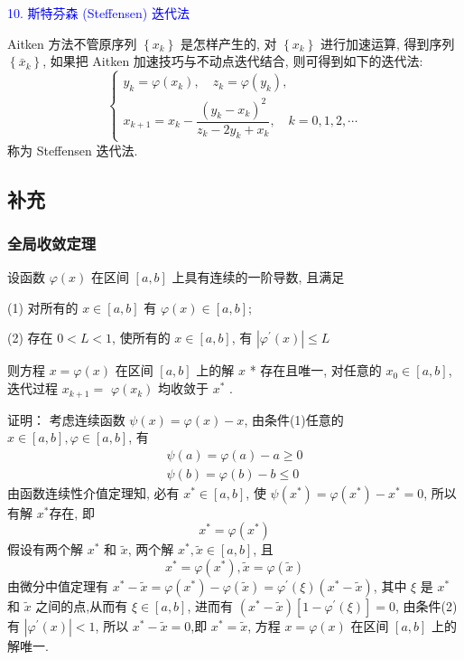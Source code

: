 \textcolor{blue}{10. 斯特芬森 (Steffensen) 迭代法}

Aitken 方法不管原序列 $ \left\{x_{k}\right\} $ 是怎样产生的, 对 $ \left\{x_{k}\right\} $ 进行加速运算, 得到序列 $ \left\{\bar{x}_{k}\right\} $, 如果把 Aitken 加速技巧与不动点迭代结合, 则可得到如下的迭代法:
$$
\left\{\begin{array}{l}
y_{k}=\varphi\left(x_{k}\right), \quad z_{k}=\varphi\left(y_{k}\right), \\
x_{k+1}=x_{k}-\dfrac{\left(y_{k}-x_{k}\right)^{2}}{z_{k}-2 y_{k}+x_{k}}, \quad k=0,1,2, \cdots
\end{array}\right.
$$
称为 Steffensen 迭代法.

\subsection{补充}
\subsubsection{全局收敛定理}
\begin{tcolorbox}[enhanced,colback=2,colframe=1,breakable,coltitle=black,title=全局收敛定理]

设函数 $ \varphi(x) $ 在区间 $ [a, b] $ 上具有连续的一阶导数, 且满足

(1) 对所有的 $ x \in[a, b] $ 有 $ \varphi(x) \in[a, b] $;

(2) 存在 $ 0<L<1 $, 使所有的 $ x \in[a, b] $, 有
$
\left|\varphi^{\prime}(x)\right| \leqslant L
$

则方程 $ x=\varphi(x) $ 在区间 $ [a, b] $ 上的解 $ x $ * 存在且唯一, 对任意的 $ x_{0} \in[a, b] $, 迭代过程 $ x_{k+1}= $ $ \varphi\left(x_{k}\right) $ 均收敛于 $ x^{*} $ .
\end{tcolorbox}

证明： 考虑连续函数 $ \psi(x)=\varphi(x)-x $, 由条件(1)任意的 $ x \in[a, b], \varphi \in[a, b] $, 有
$$
\begin{array}{l}
\psi(a)=\varphi(a)-a \geqslant 0 \\
\psi(b)=\varphi(b)-b \leqslant 0
\end{array}
$$
由函数连续性介值定理知, 必有 $ x^{*} \in[a, b] $, 使 $ \psi\left(x^{*}\right)=\varphi\left(x^{*}\right)-x^{*}=0 $, 所以有解 $ x^{*} $存在, 即
$$
x^{*}=\varphi\left(x^{*}\right)
$$
假设有两个解 $ x^{*} $ 和 $ \tilde{x} $, 两个解 $ x^{*}, \tilde{x} \in[a, b] $, 且
$$
x^{*}=\varphi\left(x^{*}\right), \tilde{x}=\varphi(\tilde{x})
$$
由微分中值定理有 $ x^{*}-\tilde{x}=\varphi\left(x^{*}\right)-\varphi(\tilde{x})=\varphi^{\prime}(\xi)\left(x^{*}-\tilde{x}\right) $, 其中 $ \xi $ 是 $ x^{*} $ 和 $ \tilde{x} $ 之间的点,从而有 $ \xi \in[a, b] $, 进而有 $ \left(x^{*}-\tilde{x}\right)\left[1-\varphi^{\prime}(\xi)\right]=0 $, 由条件(2)有 $ \left|\varphi^{\prime}(x)\right|<1 $, 所以 $ x^{*}-\tilde{x}=0 $,即 $ x^{*}=\tilde{x} $, 方程 $ x=\varphi(x) $ 在区间 $ [a, b] $ 上的解唯一.


